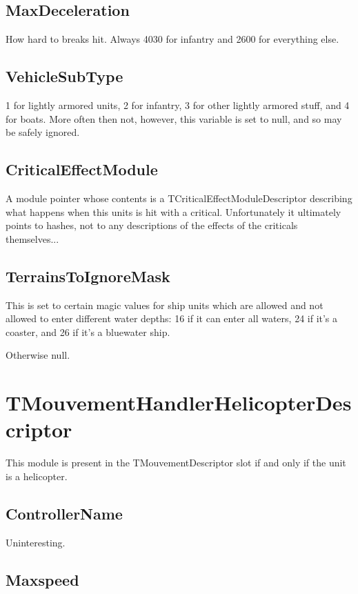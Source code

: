 \documentclass{article}
\begin{document}
\subsection{MaxDeceleration}

How hard to breaks hit. Always 4030 for infantry and 2600 for everything else.

\subsection{VehicleSubType}

1 for lightly armored units, 2 for infantry, 3 for other lightly armored stuff, and 4 for boats. More often then not, however, this variable is set to null, and so may be safely ignored.

\subsection{CriticalEffectModule}

A module pointer whose contents is a TCriticalEffectModuleDescriptor describing what happens when this units is hit with a critical. Unfortunately it ultimately points to hashes, not to any descriptions of the effects of the criticals themselves...

\subsection{TerrainsToIgnoreMask}

This is set to certain magic values for ship units which are allowed and not allowed to enter different water depths: 16 if it can enter all waters, 24 if it's a coaster, and 26 if it's a bluewater ship.

Otherwise null.

\section{TMouvementHandlerHelicopterDescriptor}

This module is present in the TMouvementDescriptor slot if and only if the unit is a helicopter.

\subsection{ControllerName}

Uninteresting.

\subsection{Maxspeed}
\end{document}
